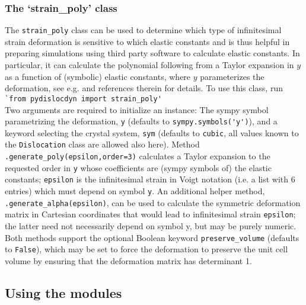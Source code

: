 \documentclass[11pt,letterpaper,oneside,pdftex]{article}
\begin{document}
\subsubsection{The `strain\_poly' class}
\label{sec:strain_poly}

The \verb|strain_poly| class can be used to determine which type of infinitesimal strain deformation is sensitive to which elastic constants and is thus helpful in preparing simulations using third party software to calculate elastic constants.
In particular, it can calculate the polynomial following from a Taylor expansion in $y$ as a function of (symbolic) elastic constants, where $y$ parameterizes the deformation, see e.g. \cite{Gu:2019,Blaschke:2021temperature} and references therein for details.
To use this class, run
\\\verb|`from pydislocdyn import strain_poly'|\\
Two arguments are required to initialize an instance:
The sympy symbol parametrizing the deformation, \verb|y| (defaults to \verb|sympy.symbols('y')|), and a keyword selecting the crystal system, \verb|sym| (defaults to \verb|cubic|, all values known to the \verb|Dislocation| class are allowed also here).
Method \verb|.generate_poly(epsilon,order=3)| calculates a Taylor expansion to the requested order in \verb|y| whose coefficients are (sympy symbols of) the elastic constants; \verb|epsilon| is the infinitesimal strain in Voigt notation (i.e. a list with 6 entries) which must depend on symbol \verb|y|.
An additional helper method, \verb|.generate_alpha(epsilon)|, can be used to calculate the symmetric deformation matrix in Cartesian coordinates that would lead to infinitesimal strain \verb|epsilon|;
the latter need not necessarily depend on symbol y, but may be purely numeric.
Both methods support the optional Boolean keyword \verb|preserve_volume| (defaults to \verb|False|), which may be set to force the deformation to preserve the unit cell volume by ensuring that the deformation matrix has determinant 1.



\subsection{Using the modules}
\end{document}
